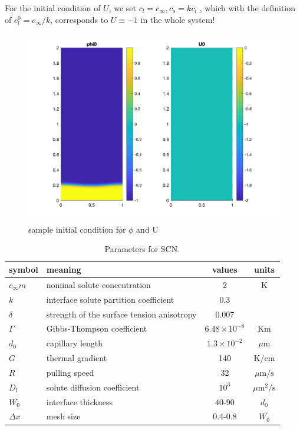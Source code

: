 \documentclass[a4paper,12pt]{article}
\begin{document}
For the initial condition of $U$, we set $c_l = c_{\infty}, c_s = k c_l$ \cite{Echebarria2004}, which with the definition of $c_l^0 = c_{\infty} /k $, corresponds to $U \equiv -1$ in the whole system!

\begin{figure}
\centering
\includegraphics[width=0.9\linewidth]{./figures/initial.png}
\caption{sample initial condition for $\phi$ and U}
\end{figure}






\begin{table}
\centering
\caption{Parameters for SCN.}
\begin{tabular}{l l c c }
\toprule
symbol & meaning & values & units \\
\midrule
$c_{\infty}m$ & nominal solute concentration &  2 & K \\
$k$ & interface solute partition coefficient & 0.3 &\\
$\delta$ & strength of the surface tension anisotropy  &  0.007  &\\
$\Gamma$ & Gibbs-Thompson coefficient & $6.48\times 10^{-8}$ & Km \\
$d_0$ & capillary length & $ 1.3\times10^{-2}$  & $\mu$m \\
$G$ & thermal gradient & 140 & $\text{K} / \text{cm}$ \\
$R$ & pulling speed &  32 & $\mu \text{m} / \text{s}$ \\
$D_l$ & solute diffusion coefficient &$10^{3}$ &  ${\mu\text{m}}^2/\text{s}$ \\
$W_0$ & interface thickness  & 40-90  & $d_0$ \\
$\Delta x$ & mesh size & 0.4-0.8 & $W_0$ \\
\bottomrule
\end{tabular}\label{tab:SCN}

\end{table}
\end{document}
